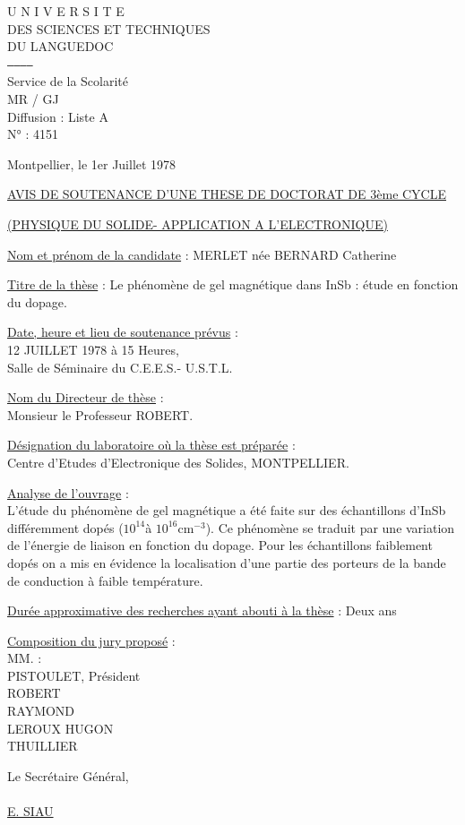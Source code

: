 U N I V E R S I T E\\
DES SCIENCES ET TECHNIQUES\\
DU LANGUEDOC\\
\texttt{------------}\\
Service de la Scolarité\\
MR / GJ\\
Diffusion : Liste A\\
N° : 4151

\unsure{-} Montpellier, le 1er Juillet 1978

\uline{AVIS DE SOUTENANCE D'UNE THESE DE DOCTORAT DE 3ème CYCLE}

\uline{(PHYSIQUE DU SOLIDE\quad - APPLICATION A L'ELECTRONIQUE\qquad )}

\uline{Nom et prénom de la candidate} : MERLET née BERNARD Catherine

\uline{Titre de la thèse} : Le phénomène de gel magnétique dans InSb : étude en fonction du dopage.

\uline{Date, heure et lieu de soutenance prévus} :\\
12 JUILLET 1978 à 15 Heures,\\
Salle de Séminaire du C.E.E.S.- U.S.T.L.

\uline{Nom du Directeur de thèse} :\\
Monsieur le Professeur ROBERT.

\uline{Désignation du laboratoire où la thèse est préparée} :\\
Centre d'Etudes d'Electronique des Solides, MONTPELLIER.

\uline{Analyse de l'ouvrage} :\\
L'étude du phénomène de gel magnétique a été faite sur des échantillons d'InSb différemment dopés ($10^{14}$à $10^{16}\mathrm{cm}^{-3}$). Ce phénomène se traduit par une variation de l'énergie de liaison en fonction du dopage. Pour les échantillons faiblement dopés on a mis en évidence la localisation d'une partie des porteurs de la bande de conduction à faible température.

\uline{Durée approximative des recherches ayant abouti à la thèse} : Deux ans

\uline{Composition du jury proposé} :\\
MM. :\\
PISTOULET, Président\\
ROBERT\\
RAYMOND\\
LEROUX HUGON\\
THUILLIER

Le Secrétaire Général,\\

\\

\uline{E. SIAU}



